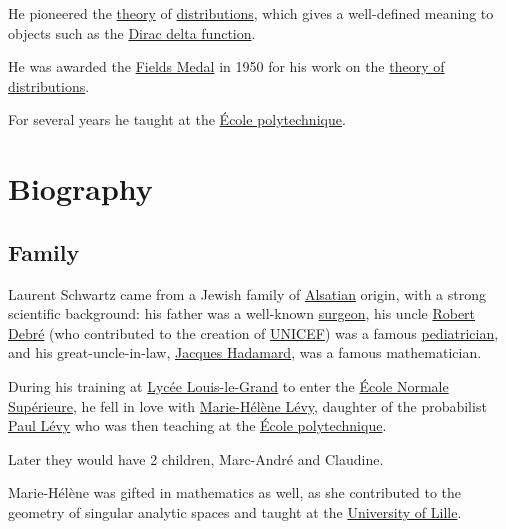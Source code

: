 \documentclass{book}
\numberwithin{equation}{section}
\begin{document}
He pioneered the \href{https://en.wikipedia.org/wiki/Theory}{theory} of \href{https://en.wikipedia.org/wiki/Distribution_(mathematics)}{distributions}, which gives a well-defined meaning to objects such as the \href{https://en.wikipedia.org/wiki/Dirac_delta_function}{Dirac delta function}.

He was awarded the \href{https://en.wikipedia.org/wiki/Fields_Medal}{Fields Medal} in 1950 for his work on the \href{https://en.wikipedia.org/wiki/Distribution_(mathematics)}{theory of distributions}.

For several years he taught at the \href{https://en.wikipedia.org/wiki/%C3%89cole_polytechnique}{École polytechnique}.
    
\section{Biography}

\subsection{Family}
Laurent Schwartz came from a Jewish family of \href{https://en.wikipedia.org/wiki/Alsace}{Alsatian} origin, with a strong scientific background: his father was a well-known \href{https://en.wikipedia.org/wiki/Surgeon}{surgeon}, his uncle \href{https://en.wikipedia.org/wiki/Robert_Debr%C3%A9}{Robert Debré} (who contributed to the creation of \href{https://en.wikipedia.org/wiki/UNICEF}{UNICEF}) was a famous \href{https://en.wikipedia.org/wiki/Pediatrics}{pediatrician}, and his great-uncle-in-law, \href{https://en.wikipedia.org/wiki/Jacques_Hadamard}{Jacques Hadamard}, was a famous mathematician.

%
During his training at \href{https://en.wikipedia.org/wiki/Lyc%C3%A9e_Louis-le-Grand}{Lycée Louis-le-Grand} to enter the \href{https://en.wikipedia.org/wiki/%C3%89cole_Normale_Sup%C3%A9rieure}{École Normale Supérieure}, he fell in love with \href{https://en.wikipedia.org/wiki/Marie-H%C3%A9l%C3%A8ne_Schwartz}{Marie-Hélène Lévy}, daughter of the probabilist \href{https://en.wikipedia.org/wiki/Paul_L%C3%A9vy_(mathematician)}{Paul Lévy} who was then teaching at the \href{https://en.wikipedia.org/wiki/%C3%89cole_polytechnique}{École polytechnique}.
    
Later they would have 2 children, Marc-André and Claudine.

Marie-Hélène was gifted in mathematics as well, as she contributed to the geometry of singular analytic spaces and taught at the \href{https://en.wikipedia.org/wiki/Universit%C3%A9_Lille_Nord_de_France}{University of Lille}.
\end{document}
